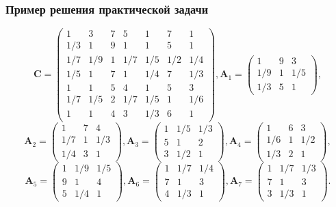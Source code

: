\documentclass[ucs, notheorems, handout]{beamer}
\begin{document}
\begin{frame}
    \frametitle{Пример решения практической задачи}

$$\bm{C}= \begin{pmatrix}
1 & 3 & 7 & 5 & 1 & 7 & 1\\
1/3 & 1 & 9 & 1 & 1 & 5 & 1\\
1/7 & 1/9 & 1 & 1/7 & 1/5 & 1/2 & 1/4\\
1/5 & 1 & 7 & 1 & 1/4 & 7 & 1/3\\
1 & 1 & 5 & 4 & 1 & 5 & 3\\
1/7 & 1/5 & 2 & 1/7 & 1/5 & 1 & 1/6\\
1 & 1 & 4 & 3 & 1/3 & 6 & 1
\end{pmatrix}\!,
\bm{A}_1= \begin{pmatrix}
1 & 9 & 3\\
1/9 & 1 & 1/5\\
1/3 & 5 & 1
\end{pmatrix}\!,
$$
$$\bm{A}_2= \begin{pmatrix}
1 & 7 & 4\\
1/7 & 1 & 1/3\\
1/4 & 3 & 1
\end{pmatrix}\!,
\bm{A}_3= \begin{pmatrix}
1 & 1/5 & 1/3\\
5 & 1 & 2\\
3 & 1/2 & 1
\end{pmatrix}\!,
\bm{A}_4= \begin{pmatrix}
1 & 6 & 3\\
1/6 & 1 & 1/2\\
1/3 & 2 & 1
\end{pmatrix}\!,$$
$$
\bm{A}_5= \begin{pmatrix}
1 & 1/9 & 1/5\\
9 & 1 & 4\\
5 & 1/4 & 1
\end{pmatrix}\!,
\bm{A}_6= \begin{pmatrix}
1 & 1/7 & 1/4\\
7 & 1 & 3\\
4 & 1/3 & 1
\end{pmatrix}\!,
\bm{A}_7= \begin{pmatrix}
1 & 1/7 & 1/3\\
7 & 1 & 3\\
3 & 1/3 & 1
\end{pmatrix}\!.
$$

\end{frame}
\end{document}
